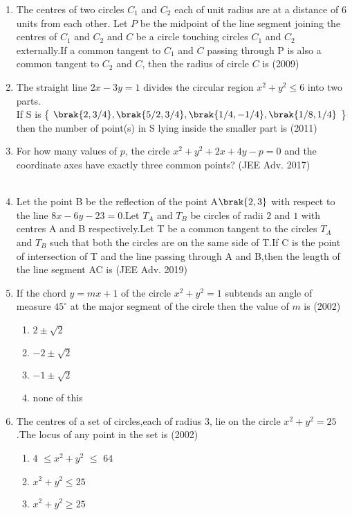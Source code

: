 \begin{enumerate}
	\hfill{}
\item The centres of two circles $C_1$ and $C_2$ each of unit radius are at a distance of $6$ units from each other. Let $P$ be the midpoint of the line segment joining the centres of $C_1$ and $C_2$ and $C$ be a circle touching circles $C_1$ and $C_2$ externally.If a common tangent to $C_1$ and $C$ passing through P is also a common tangent to $C_2$ and $C$, then the radius of circle $C$ is \hfill(2009)\\
\item The straight line $2x-3y=1$ divides the circular region $x^2+y^2\leq6$ into two parts.\\
If  S  is \{ $\brak{2,3/4},\brak{5/2,3/4},\brak{1/4,-1/4},\brak{1/8,1/4}$ \}  then the  number of point(s) in S lying inside the smaller part is \hfill(2011)\\
\item For how many values of $p$, the circle $x^2+y^2+2x+4y-p=0$ and the coordinate axes have exactly three common points? \hfill(JEE Adv. 2017)\\
\\
\item Let the point B be the reflection of the point A$\brak{2,3}$ with respect to the line $8x-6y-23=0$.Let $T_A$ and $T_B$ be circles of radii $2$ and $1$ with centres A and B respectively.Let T be a common tangent to the circles $T_A$ and $T_B$ such that both the circles are on the same side of T.If C is the point of intersection of T and the line passing through A and B,then the length of the line segment AC is \hfill(JEE Adv. 2019)
\item If the chord $y=mx+1$ of the circle $x^2+y^2=1$ subtends an angle of measure \( 45^\circ \) at the major segment of the circle then the value of $m$ is \hfill(2002)
\begin{enumerate}
\item$2\pm\sqrt{2}$
\item$-2\pm\sqrt{2}$
\item$-1\pm\sqrt{2}$
\item none of this
\end{enumerate}
\item The centres of a set of circles,each of radius $3$, lie on the circle $x^2+y^2=25$.The locus of any point in the set is \hfill(2002)
\begin{enumerate}
\item$4$ $\leq$$x^2+y^2$ $\leq$ $64$
\item$x^2+y^2\leq25$
\item$x^2+y^2\geq25$
$$
\end{enumerate}
\end{enumerate}
